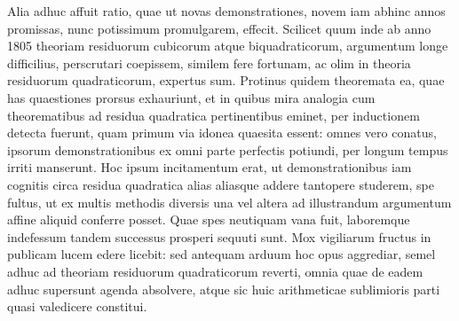 Alia adhuc affuit ratio, quae ut novas demonstrationes, novem iam abhinc annos promissas, nunc potissimum promulgarem, effecit. Scilicet quum inde ab anno 1805 theoriam residuorum cubicorum atque biquadraticorum, argumentum longe difficilius, perscrutari coepissem, similem fere fortunam, ac olim in theoria residuorum quadraticorum, expertus sum. Protinus quidem theoremata ea, quae has quaestiones prorsus exhauriunt, et in quibus mira analogia cum theorematibus ad residua quadratica pertinentibus eminet, per inductionem detecta fuerunt, quam primum via idonea quaesita essent: omnes vero conatus, ipsorum demonstrationibus ex omni parte perfectis potiundi, per longum tempus irriti manserunt. Hoc ipsum incitamentum erat, ut demonstrationibus iam cognitis circa residua quadratica alias aliasque addere tantopere studerem, spe fultus, ut ex multis methodis diversis una vel altera ad illustrandum argumentum affine aliquid conferre posset. Quae spes neutiquam vana fuit, laboremque indefessum tandem successus prosperi sequuti sunt. Mox vigiliarum fructus in publicam lucem edere licebit: sed antequam arduum hoc opus aggrediar, semel adhuc ad theoriam residuorum quadraticorum reverti, omnia quae de eadem adhuc supersunt agenda absolvere, atque sic huic arithmeticae sublimioris parti quasi valedicere constitui.

